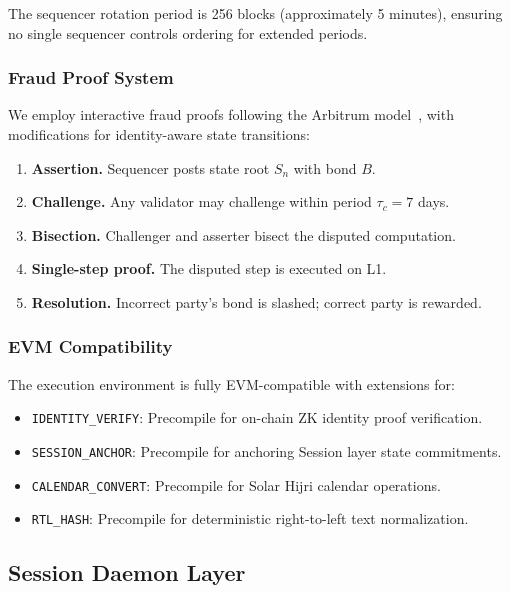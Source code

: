 \documentclass[11pt,a4paper]{article}
\begin{document}
The sequencer rotation period is 256 blocks (approximately 5 minutes), ensuring no single sequencer controls ordering for extended periods.

\subsubsection{Fraud Proof System}

We employ interactive fraud proofs following the Arbitrum model~\cite{kalodner2018arbitrum}, with modifications for identity-aware state transitions:

\begin{enumerate}
    \item \textbf{Assertion.} Sequencer posts state root $S_n$ with bond $B$.
    \item \textbf{Challenge.} Any validator may challenge within period $\tau_c = 7$ days.
    \item \textbf{Bisection.} Challenger and asserter bisect the disputed computation.
    \item \textbf{Single-step proof.} The disputed step is executed on L1.
    \item \textbf{Resolution.} Incorrect party's bond is slashed; correct party is rewarded.
\end{enumerate}

\subsubsection{EVM Compatibility}

The execution environment is fully EVM-compatible with extensions for:

\begin{itemize}
    \item \texttt{IDENTITY\_VERIFY}: Precompile for on-chain ZK identity proof verification.
    \item \texttt{SESSION\_ANCHOR}: Precompile for anchoring Session layer state commitments.
    \item \texttt{CALENDAR\_CONVERT}: Precompile for Solar Hijri calendar operations.
    \item \texttt{RTL\_HASH}: Precompile for deterministic right-to-left text normalization.
\end{itemize}

\subsection{Session Daemon Layer}
\end{document}
